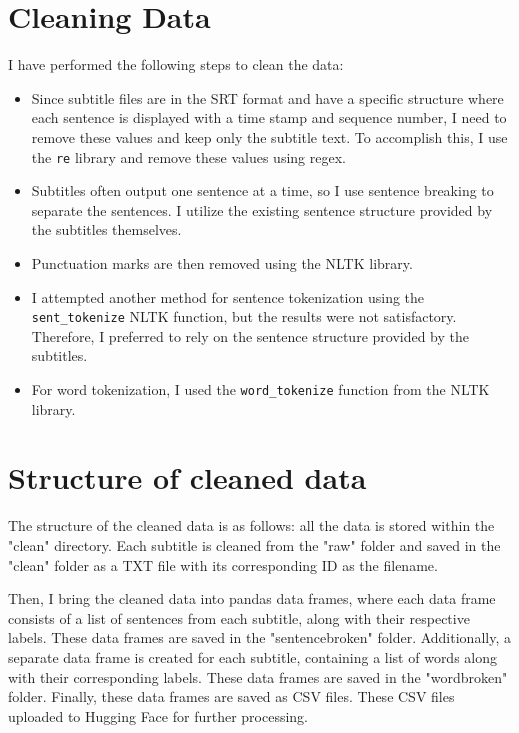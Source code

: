 \documentclass[a4paper]{article}
\begin{document}
\section{Cleaning Data}

I have performed the following steps to clean the data:

\begin{itemize}
  \item Since subtitle files are in the SRT format and have a specific structure where each sentence is displayed with a time stamp and sequence number, I need to remove these values and keep only the subtitle text. To accomplish this, I use the \texttt{re} library and remove these values using regex.
  
  \item Subtitles often output one sentence at a time, so I use sentence breaking to separate the sentences. I utilize the existing sentence structure provided by the subtitles themselves.
  
  \item Punctuation marks are then removed using the NLTK library.
  
  \item I attempted another method for sentence tokenization using the \texttt{sent\_tokenize} NLTK function, but the results were not satisfactory. Therefore, I preferred to rely on the sentence structure provided by the subtitles.
  
  \item For word tokenization, I used the \texttt{word\_tokenize} function from the NLTK library.
\end{itemize}

\section{Structure of cleaned data}

The structure of the cleaned data is as follows: all the data is stored within the "clean" directory. Each subtitle is cleaned from the "raw" folder and saved in the "clean" folder as a TXT file with its corresponding ID as the filename.

Then, I bring the cleaned data into pandas data frames, where each data frame consists of a list of sentences from each subtitle, along with their respective labels. These data frames are saved in the "sentencebroken" folder. Additionally, a separate data frame is created for each subtitle, containing a list of words along with their corresponding labels. These data frames are saved in the "wordbroken" folder. Finally, these data frames are saved as CSV files. These CSV files uploaded to Hugging Face for further processing.
\end{document}
